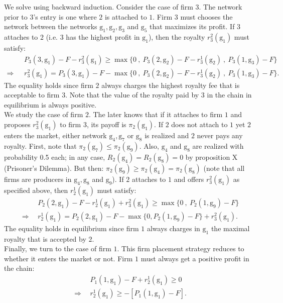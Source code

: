 \documentclass{article}
\begin{document}
\indent We solve using backward induction. Consider the case of firm $3$. The network prior to $3$'s entry is one where $2$ is attached to $1$. Firm $3$ must chooses the network between the networks $\text{g}_1, \text{g}_2,\text{g}_3$ and $\text{g}_5$ that maximizes its profit. If $3$ attaches to $2$ (i.e. $3$ has the highest profit in $\text{g}_1$), then the royalty $r^2_3(\text{g}_1)$ must satisfy: 
\begin{align*}
    & P_3(3,\text{g}_1)-F -r^2_{3}(\text{g}_1) \geq \max\{0~,~P_3(2,\text{g}_2)-F -r^1_{3}(\text{g}_2) ~,~ P_3(1,\text{g}_3)-F \}\\
    \Longrightarrow ~~~& r^2_3(\text{g}_1 )  = P_3(3,\text{g}_1)-F - \max\{0~,~P_3(2,\text{g}_2)-F -r^1_{3}(\text{g}_2) ~,~ P_3(1,\text{g}_3)-F \}.
\end{align*}
The equality holds since firm $2$ always charges the highest royalty fee that is acceptable to firm $3$. Note that the value of the royalty paid by $3$ in the chain in equilibrium is always positive.  \\
\indent We study the case of firm $2$. The later knows that if it attaches to firm $1$ and proposes $r^2_3(\text{g}_1)$ to firm $3$, its payoff is $\pi_2(\text{g}_1)$. If $2$ does not attach to $1$ yet $2$ enters the market, either network $\text{g}_4, \text{g}_7$ or $\text{g}_8$ is realized and $2$ never pays any royalty. First, note that $\pi_2(\text{g}_7)\leq \pi_2(\text{g}_9)$. Also, $\text{g}_4$ and $\text{g}_8$ are realized with probability 0.5 each; in any case, $R_2(\text{g}_4)=R_2(\text{g}_8)=0$ by proposition X (Prisoner's Dilemma). But then: $\pi_2(\text{g}_9)\geq \pi_2(\text{g}_4)=\pi_2(\text{g}_8)$ (note that all firms are producers in $\text{g}_4,\text{g}_8$ and $\text{g}_9$). 
If $2$ attaches to $1$ and offers $r^2_3(\text{g}_1)$ as specified above, then $r^1_2(\text{g}_1)$ must satisfy: 
\begin{align*}
   & P_2(2,\text{g}_1)-F -r^1_2(\text{g}_1)+r^2_3(\text{g}_1)\geq \max\{0~,~P_2(1,\text{g}_9)-F\}\\
   \Longrightarrow~~ & r^1_2(\text{g}_1)= P_2(2,\text{g}_1)-F-\max\{0, P_2(1,\text{g}_9) -F\} + r^2_3(\text{g}_1).
\end{align*}
The equality holds in equilibrium since firm $1$ always charges in $\text{g}_1$ the maximal royalty that is accepted by $2$. \\
\indent Finally, we turn to the case of firm $1$. This firm placement strategy reduces to whether it enters the market or not. Firm $1$ must always get a positive profit in the chain: 
\begin{align*}
   & P_1(1,\text{g}_1) -F+ r^1_2(\text{g}_1)\geq 0 \\
\Longrightarrow ~~ & r^1_2 (\text{g}_1)\geq -[P_1(1,\text{g}_1) -F].   
\end{align*}
\end{document}
